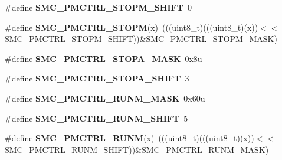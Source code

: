 \begin{DoxyCompactItemize}
\item 
\#define {\bfseries S\+M\+C\+\_\+\+P\+M\+C\+T\+R\+L\+\_\+\+S\+T\+O\+P\+M\+\_\+\+S\+H\+I\+FT}~0\hypertarget{group__SMC__Register__Masks_gaac7423086f31a8fbbfc8d18b1a876f26}{}\label{group__SMC__Register__Masks_gaac7423086f31a8fbbfc8d18b1a876f26}

\item 
\#define {\bfseries S\+M\+C\+\_\+\+P\+M\+C\+T\+R\+L\+\_\+\+S\+T\+O\+PM}(x)~(((uint8\+\_\+t)(((uint8\+\_\+t)(x))$<$$<$S\+M\+C\+\_\+\+P\+M\+C\+T\+R\+L\+\_\+\+S\+T\+O\+P\+M\+\_\+\+S\+H\+I\+FT))\&S\+M\+C\+\_\+\+P\+M\+C\+T\+R\+L\+\_\+\+S\+T\+O\+P\+M\+\_\+\+M\+A\+SK)\hypertarget{group__SMC__Register__Masks_gaa2ea36f819a21ef6b513564dc1453958}{}\label{group__SMC__Register__Masks_gaa2ea36f819a21ef6b513564dc1453958}

\item 
\#define {\bfseries S\+M\+C\+\_\+\+P\+M\+C\+T\+R\+L\+\_\+\+S\+T\+O\+P\+A\+\_\+\+M\+A\+SK}~0x8u\hypertarget{group__SMC__Register__Masks_gadd72ad662b62a7b51225b529fef2c77a}{}\label{group__SMC__Register__Masks_gadd72ad662b62a7b51225b529fef2c77a}

\item 
\#define {\bfseries S\+M\+C\+\_\+\+P\+M\+C\+T\+R\+L\+\_\+\+S\+T\+O\+P\+A\+\_\+\+S\+H\+I\+FT}~3\hypertarget{group__SMC__Register__Masks_gadfe89210f121f10b74f2fba55f059e1d}{}\label{group__SMC__Register__Masks_gadfe89210f121f10b74f2fba55f059e1d}

\item 
\#define {\bfseries S\+M\+C\+\_\+\+P\+M\+C\+T\+R\+L\+\_\+\+R\+U\+N\+M\+\_\+\+M\+A\+SK}~0x60u\hypertarget{group__SMC__Register__Masks_ga1a456925e291d6d53f4891b25fcaf8eb}{}\label{group__SMC__Register__Masks_ga1a456925e291d6d53f4891b25fcaf8eb}

\item 
\#define {\bfseries S\+M\+C\+\_\+\+P\+M\+C\+T\+R\+L\+\_\+\+R\+U\+N\+M\+\_\+\+S\+H\+I\+FT}~5\hypertarget{group__SMC__Register__Masks_ga8f8dc472f4a4b6ad1babae518c44d55e}{}\label{group__SMC__Register__Masks_ga8f8dc472f4a4b6ad1babae518c44d55e}

\item 
\#define {\bfseries S\+M\+C\+\_\+\+P\+M\+C\+T\+R\+L\+\_\+\+R\+U\+NM}(x)~(((uint8\+\_\+t)(((uint8\+\_\+t)(x))$<$$<$S\+M\+C\+\_\+\+P\+M\+C\+T\+R\+L\+\_\+\+R\+U\+N\+M\+\_\+\+S\+H\+I\+FT))\&S\+M\+C\+\_\+\+P\+M\+C\+T\+R\+L\+\_\+\+R\+U\+N\+M\+\_\+\+M\+A\+SK)\hypertarget{group__SMC__Register__Masks_gaa375b91daca0dd7f4b1452da903b5bdc}{}\label{group__SMC__Register__Masks_gaa375b91daca0dd7f4b1452da903b5bdc}


\end{DoxyCompactItemize}
